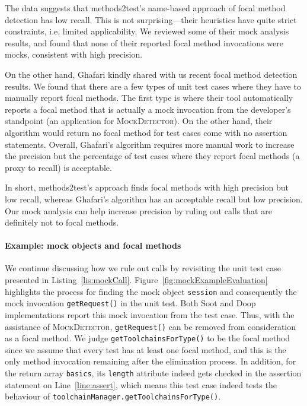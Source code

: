 The data suggests that methods2test's name-based approach of focal method detection has low recall. This is not surprising---their heuristics have quite strict constraints, i.e. limited applicability. We reviewed some of their mock analysis results, and found that none of their reported focal method invocations were mocks, consistent with high precision.

On the other hand, Ghafari kindly shared with us recent focal method detection results. We found that there are a few types of unit test cases where they have to manually report focal methods. The first type is where their tool automatically reports a focal method that is actually a mock invocation from the developer's standpoint (an application for \textsc{MockDetector}). On the other hand, their algorithm would return no focal method for test cases come with no assertion statements. Overall, Ghafari's algorithm requires more manual work to increase the precision but the percentage of test cases where they report focal methods (a proxy to recall) is acceptable. 

In short, methods2test's approach finds focal methods with high precision but low recall, whereas Ghafari's algorithm has an acceptable recall but low precision. Our mock analysis can help increase precision by ruling out calls that are definitely not to focal methods.

\paragraph{Example: mock objects and focal methods} We continue discussing how we rule out calls by revisiting the unit test case presented in Listing~\ref{lis:mockCall}. Figure~\ref{fig:mockExampleEvaluation} highlights the process for finding the mock object \texttt{session} and consequently the mock invocation \texttt{getRequest()} in the unit test. Both Soot and Doop implementations report this mock invocation 
from the test case. Thus, with the assistance of \textsc{MockDetector}, \texttt{getRequest()} can be removed from consideration as a focal method. We judge \texttt{getToolchainsForType()} to be the focal method since we assume that every test has at least one focal method, and this is the only method invocation remaining after the elimination process. In addition, for the return array \texttt{basics}, its \texttt{length} attribute indeed gets checked in the assertion statement on Line~\ref{line:assert}, which means this test case indeed tests the behaviour of \texttt{toolchainManager.getToolchainsForType()}. 

